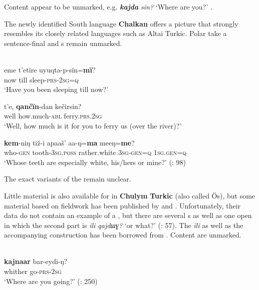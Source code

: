 \noindent Content  appear to be unmarked, e.g. \textbf{\textit{kajda}} \textit{sin?} ‘Where are you?’ \citep[104]{Baskakov1958b}.

The newly identified South  language \textbf{Chalkan} offers a picture that strongly resembles its closely related languages such as Altai Turkic. Polar  take a sentence-final  and s remain unmarked.

\ea%
    \label{ex:turk:57}
    \\
    \ea
    \gll eme  t’etire  uyuqta-p-sïn=\textbf{{mï}}?\\
    now  till  sleep-\textsc{prs}-2\textsc{sg}=\textsc{q}\\
    \glt ‘Have you been sleeping till now?’
    
    \ex
    \gll t’e, \textbf{{qančïn}}-dan    kečirsin?\\
    well  how.much-\textsc{abl}  ferry.\textsc{prs}.2\textsc{sg}\\
    \glt ‘Well, how much is it for you to ferry us (over the river)?’ \citep[78]{Nevskaja2014}
    
    \ex
    \gll \textbf{{kem}}-niŋ  tiž-i      apaaš’    aa-ŋ=\textbf{{ma}} meeŋ=\textbf{{me}}?\\
    who-\textsc{gen}  tooth-3\textsc{sg.poss} rather.white  3\textsc{sg}-\textsc{gen}=\textsc{q} 1\textsc{sg.gen}=\textsc{q}\\
    \glt ‘Whose teeth are especially white, his/hers or mine?’ (\citealt{Erdal2013}: 98)\z\z

\noindent The exact variants of the  remain unclear.

Little material is also available for  in \textbf{Chulym} \textbf{Turkic} (also called Ös), but some material based on fieldwork has been published by \citet{Harrison2003} and \citet{AndersonHarrison2006}. Unfortunately, their data do not contain an example of a , but there are several s as well as one open  in which the second part is \textit{ili qajdɯɣ?} ‘or what?’ (\citealt{AndersonHarrison2006}: 57). The  \textit{ili} as well as the accompanying construction has been borrowed from . Content  are unmarked.

\ea%
    \label{ex:turk:58}
    \\
    \gll \textbf{{kajnaar}} bar-eydi-ŋ?\\
    whither  go-\textsc{prs}-2\textsc{sg}\\
    \glt ‘Where are you going?’ (\citealt{Harrison2003}: 250)
    \z

